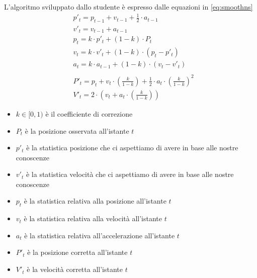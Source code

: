 L'algoritmo sviluppato dallo studente è espresso dalle equazioni in \ref{eq:smoothns}
\begin{equation}
    \label{eq:smoothns}
    \begin{split}
        & p'_t = p_{t-1} + v_{t-1} + \frac{1}{2} \cdot a_{t-1} \\
        & v'_t = v_{t-1} + a_{t-1} \\
        & p_t = k \cdot p'_t + (1-k) \cdot P_t \\
        & v_t = k \cdot v'_t + (1-k) \cdot (p_t - p'_t) \\
        & a_t = k \cdot a_{t-1} + (1-k) \cdot (v_t - v'_t) \\
        & \\
        & P'_t = p_t + v_t \cdot \left(\frac{k}{1-k}\right) + \frac{1}{2} \cdot a_t \cdot \left(\frac{k}{1-k}\right)^2 \\
        & V'_t = 2 \cdot \left(v_t + a_t \cdot \left(\frac{k}{1-k}\right)\right)
    \end{split}
\end{equation}
\begin{itemize}
    \item $k \in [0, 1)$ è il coefficiente di correzione
    \item $P_t$ è la posizione osservata all'istante $t$
    \item $p'_t$ è la statistica posizione che ci aspettiamo di avere in base alle nostre conoscenze
    \item $v'_t$ è la statistica velocità che ci aspettiamo di avere in base alle nostre conoscenze
    \item $p_t$ è la statistica relativa alla posizione all'istante $t$
    \item $v_t$ è la statistica relativa alla velocità all'istante $t$
    \item $a_t$ è la statistica relativa all'accelerazione all'istante $t$
    \item $P'_t$ è la posizione corretta all'istante $t$
    \item $V'_t$ è la velocità corretta all'istante $t$
\end{itemize}


